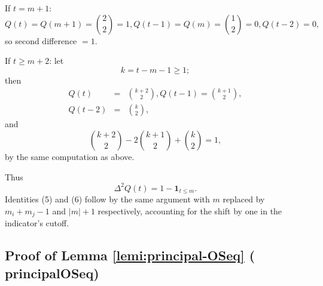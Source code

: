 \documentclass[11pt,reqno]{amsart}
\begin{document}
\bigskip 
\medskip%

\noindent%
If $t=m+1$:%
\begin{equation*}
Q(t)=Q(m+1)=\binom{2}{2}=1,Q(t-1)=Q(m)=\binom{1}{2}=0,Q(t-2)=0,
\end{equation*}%
\noindent%
so second difference $=1$. 

\bigskip 

\bigskip 
\medskip%

\noindent%
If $t\geq m+2$: let 
\begin{equation*}
k=t-m-1\geq 1;
\end{equation*}%
\noindent%
then 
\begin{eqnarray*}
Q(t) &=&\binom{k+2}{2},Q(t-1)=\binom{k+1}{2}, \\
Q(t-2) &=&\binom{k}{2},
\end{eqnarray*}%
\noindent%
and 
\begin{equation*}
\binom{k+2}{2}-2\binom{k+1}{2}+\binom{k}{2}=1,
\end{equation*}%
\noindent%
by the same computation as above.


\bigskip 
\medskip%

\noindent%
Thus 
\begin{equation*}
\Delta ^{2}Q(t)=1-\mathbf{1}_{t\leq m}.
\end{equation*}%
\noindent%
Identities (5) and (6) follow by the same argument with $m$ replaced by $%
m_{i}+m_{j}-1$ and $|m|+1$ respectively, accounting for the shift by one in
the indicator's cutoff.

\subsection*{Proof of Lemma \protect\ref{lemi:principal-OSeq} (\textsf{%
principalOSeq})}
\end{document}
